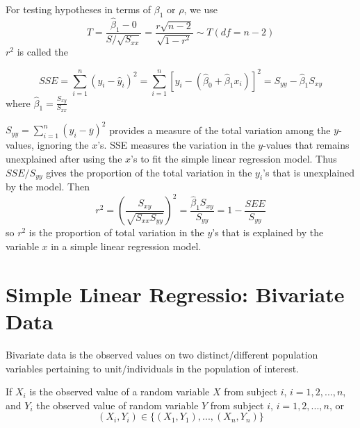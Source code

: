 \documentclass[12pt, a4paper, twoside, openright, titlepage]{book}
\begin{document}
For testing hypotheses in terms of $\beta_1$ or $\rho$, we use \begin{equation*}
    T = \frac{\hat{\beta}_1 - 0}{S/\sqrt{S_{xx}}} = \frac{r\sqrt{n-2}}{\sqrt{1-r^2}} \sim T(df = n-2)
\end{equation*}
$r^2$ is called the 

\begin{prop}{}{}
    \begin{equation*}
        SSE = \sum_{i=1}^n(y_i - \hat{y}_i)^2 = \sum_{i=1}^n[y_i - (\hat{\beta}_0 + \hat{\beta}_1x_i)]^2 = S_{yy} - \hat{\beta}_1S_{xy}
    \end{equation*}
    where $\hat{\beta}_1 = \frac{S_{xy}}{S_{xx}}$
\end{prop}

\begin{rmk}{}{}
    $S_{yy} = \sum_{i=1}^n(y_i - \overline{y})^2$ provides a measure of the total variation among the $y$-values, ignoring the $x$'s. SSE measures the variation in the $y$-values that remains unexplained after using the $x$'s to fit the simple linear regression model. Thus $SSE/S_{yy}$ gives the proportion of the total variation in the $y_i$'s that is unexplained by the model. Then \begin{equation*}
        r^2 = \left(\frac{S_{xy}}{\sqrt{S_{xx}S_{yy}}}\right)^2 = \frac{\hat{\beta}_1S_{xy}}{S_{yy}} = 1 - \frac{SEE}{S_{yy}}
    \end{equation*}
    so $r^2$ is the proportion of total variation in the $y$'s that is explained by the variable $x$ in a simple linear regression model.
\end{rmk}

\section{\textsection Simple Linear Regressio: Bivariate Data}


\begin{defn}{}{}
    Bivariate data is the observed values on two distinct/different population variables pertaining to unit/individuals in the population of interest.
\end{defn}


\begin{nota}{}{}
    If $X_i$ is the observed value of a random variable $X$ from subject $i$, $i = 1,2,...,n$, and $Y_i$ the observed value of random variable $Y$ from subject $i$, $i = 1,2,...,n$, or \begin{equation*}
        (X_i,Y_i) \in \{(X_1,Y_1),...,(X_n,Y_n)\}
    \end{equation*}
\end{nota}
\end{document}
